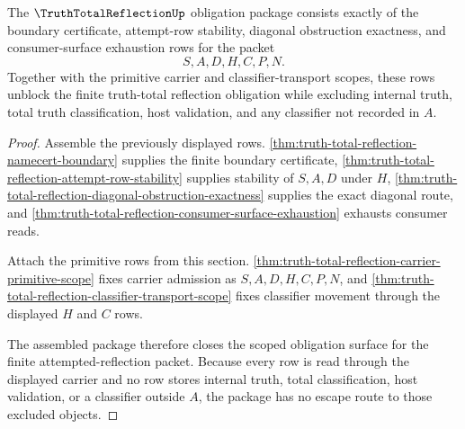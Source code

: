 \begin{theorem}
\label{thm:truth-total-reflection-obligation-unblock-package}
The $\TruthTotalReflectionUp$ obligation package consists exactly of the boundary certificate, attempt-row stability, diagonal obstruction exactness, and consumer-surface exhaustion rows for the packet
$$
S,A,D,H,C,P,N.
$$
Together with the primitive carrier and classifier-transport scopes, these rows unblock the finite truth-total reflection obligation while excluding internal truth, total truth classification, host validation, and any classifier not recorded in $A$.
\end{theorem}
\begin{proof}
Assemble the previously displayed rows. \autoref{thm:truth-total-reflection-namecert-boundary} supplies the finite boundary certificate, \autoref{thm:truth-total-reflection-attempt-row-stability} supplies stability of $S,A,D$ under $H$, \autoref{thm:truth-total-reflection-diagonal-obstruction-exactness} supplies the exact diagonal route, and \autoref{thm:truth-total-reflection-consumer-surface-exhaustion} exhausts consumer reads.

Attach the primitive rows from this section. \autoref{thm:truth-total-reflection-carrier-primitive-scope} fixes carrier admission as $S,A,D,H,C,P,N$, and \autoref{thm:truth-total-reflection-classifier-transport-scope} fixes classifier movement through the displayed $H$ and $C$ rows.

The assembled package therefore closes the scoped obligation surface for the finite attempted-reflection packet. Because every row is read through the displayed carrier and no row stores internal truth, total classification, host validation, or a classifier outside $A$, the package has no escape route to those excluded objects.
\end{proof}

